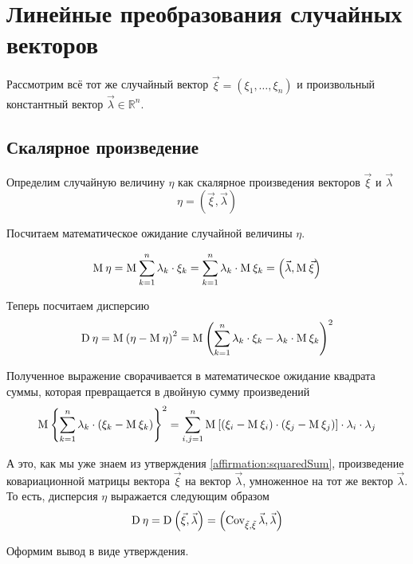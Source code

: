 \section{Линейные преобразования случайных векторов}
\label{section:linearTransformations}

Рассмотрим всё тот же случайный вектор $\vec{\xi} = \left( \xi_1, \dots, \xi_n
\right)$ и произвольный константный вектор $\vec{\lambda} \in \mathbb{R}^n$.

\subsection{Скалярное произведение}
Определим случайную величину $\eta$ как скалярное произведения векторов
$\vec{\xi}$ и $\vec{\lambda}$
$$\eta = \left( \vec{\xi}, \vec{\lambda} \right)$$

Посчитаем математическое ожидание случайной величины $\eta$.

\begin{equation}\label{eq:scalarMulMean}
  \operatorname{M}_{} \eta
      = \operatorname{M}_{} \sum_{k=1}^{n} \lambda_k \cdot \xi_k
      = \sum_{k=1}^{n} \lambda_k \cdot \operatorname{M}_{} \xi_k
      = \left( \vec{\lambda}, \operatorname{M}_{} \vec{\xi} \right)
\end{equation}

Теперь посчитаем дисперсию
$$\operatorname{D}_{} \eta
  = \operatorname{M}_{} \left( \eta - \operatorname{M}_{} \eta \right)^2
  = \operatorname{M}_{} \left( \sum_{k=1}^{n} \lambda_k \cdot \xi_k
      - \lambda_k \cdot \operatorname{M}_{} \xi_k \right)^2$$

Полученное выражение сворачивается в математическое ожидание квадрата суммы,
которая превращается в двойную сумму произведений
$$\operatorname{M}_{} \left\{ \sum_{k=1}^{n} \lambda_k
  \cdot \left( \xi_k - \operatorname{M}_{} \xi_k \right) \right\}^2
  = \sum_{i,j=1}^{n}\operatorname{M}_{} \left[ \left( \xi_i - \operatorname{M}_{} \xi_i \right)
      \cdot \left( \xi_j - \operatorname{M}_{} \xi_j \right) \right]
      \cdot \lambda_i \cdot \lambda_j$$

А это, как мы уже знаем из утверждения \ref{affirmation:squaredSum},
произведение ковариационной матрицы вектора $\vec{\xi}$
на вектор $\vec{\lambda}$, умноженное на тот же вектор $\vec{\lambda}$.
То есть, дисперсия $\eta$ выражается следующим образом
\begin{equation}\label{eq:linearQuadraticForm}
\operatorname{D}_{} \eta
  = \operatorname{D}_{} \left( \vec{\xi}, \vec{\lambda} \right)
  = \left( \operatorname{Cov^{}_{\vec{\xi}, \vec{\xi}}} \vec{\lambda}, \vec{\lambda} \right)
\end{equation}

Оформим вывод в виде утверждения.

